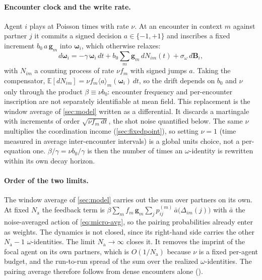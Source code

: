 \documentclass[
  aps,prx,
  reprint,
  superscriptaddress,
  nofootinbib,
  longbibliography
]{revtex4-2}
\newcommand{\w}{\bm{\omega}}
\newcommand{\g}{\mathbf{g}}
\newcommand{\sidn}{\sigma_{\omega}}
\newcommand{\Nag}{N_{\mathrm{a}}}
\newcommand{\smref}[1]{\cite[Sec.~#1]{SM}}
\begin{document}
\paragraph{Encounter clock and the write rate.} Agent $i$ plays at Poisson times with rate $\nu$. At an encounter in context $m$ against partner $j$ it commits a signed decision $a\in\{-1,+1\}$ and inscribes a fixed increment $b_0\,a\,\g_m$ into $\w_i$, which otherwise relaxes:
\begin{equation}\label{eq:micro-sde}
d\w_i = -\gamma\,\w_i\,dt + b_0\sum_m \g_m\,dN_{im}(t) + \sidn\,d\bm B_i,
\end{equation}
with $N_{im}$ a counting process of rate $\nu f_m$ with signed jumps $a$. Taking the compensator, $\mathbb E[dN_{im}]=\nu f_m\langle a\rangle_m(\w_i)\,dt$, so the drift depends on $b_0$ and $\nu$ only through the product $\beta\equiv\nu b_0$: encounter frequency and per-encounter inscription are not separately identifiable at mean field. This replacement is the window average of \cref{sec:model} written as a differential. It discards a martingale with increments of order $\sqrt{\nu f_m\,dt}$, the shot noise quantified below. The same $\nu$ multiplies the coordination income (\cref{sec:fixedpoint}), so setting $\nu=1$ (time measured in average inter-encounter intervals) is a global units choice, not a per-equation one. $\beta/\gamma=\nu b_0/\gamma$ is then the number of times an $\omega$-identity is rewritten within its own decay horizon.

\paragraph{Order of the two limits.} The window average of \cref{sec:model} carries out the sum over partners on its own. At fixed $\Nag$ the feedback term is $\beta\sum_m f_m\,\g_m\sum_j p^{(m)}_{ij}\,\bar a\bigl(\Delta_{im}(j)\bigr)$ with $\bar a$ the noise-averaged action of \cref{eq:micro-avg}, so the pairing probabilities already enter as weights. The dynamics is not closed, since its right-hand side carries the other $\Nag-1$ $\omega$-identities. The limit $\Nag\to\infty$ closes it. It removes the imprint of the focal agent on its own partners, which is $O(1/\Nag)$ because $\nu$ is a fixed per-agent budget, and the run-to-run spread of the sum over the realized $\omega$-identities. The pairing average therefore follows from dense encounters alone (\smref{S8}).
\end{document}
